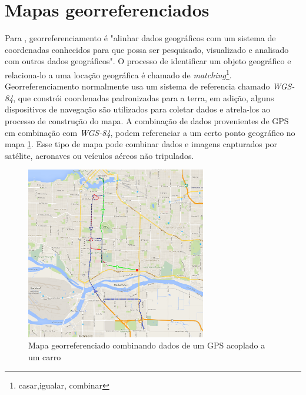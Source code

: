\section{Mapas georreferenciados}
Para \cite{Meng2014}, georreferenciamento é "alinhar dados geográficos com um sistema de coordenadas conhecidos para que possa ser pesquisado, visualizado e analisado com outros dados geográficos". O processo de identificar um objeto geográfico e relaciona-lo a uma locação geográfica é chamado de \textit{matching}\footnote{casar,igualar, combinar}. Georreferenciamento  normalmente usa um sistema de referencia chamado \textit{WGS-84}, que constrói coordenadas padronizadas para a terra, em adição, alguns dispositivos de navegação são utilizados para coletar dados e atrela-los ao processo de construção do mapa. A combinação de dados provenientes de GPS em combinação com \textit{WGS-84}, podem referenciar a um certo ponto geográfico no mapa \ref{fig:mapa:georef}. Esse tipo de mapa pode combinar dados e imagens capturados por satélite, aeronaves ou veículos aéreos não tripulados. 

\begin{figure}[H]
    \centering
    \includegraphics[width=0.7\textwidth]{figuras/Screen Shot 2016-05-12 at 3.25.21 PM.png}
    \caption{Mapa georreferenciado combinando dados de um GPS acoplado a um carro}
    \label{fig:mapa:georef}
\end{figure}
